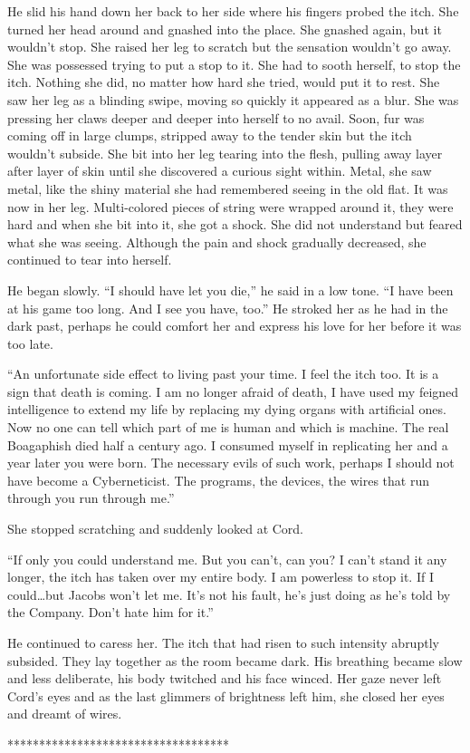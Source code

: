 He slid his hand down her back to her side where his fingers probed the
itch. She turned her head around and gnashed into the place. She gnashed
again, but it wouldn't stop. She raised her leg to scratch but the
sensation wouldn't go away. She was possessed trying to put a stop to
it. She had to sooth herself, to stop the itch. Nothing she did, no
matter how hard she tried, would put it to rest. She saw her leg as a
blinding swipe, moving so quickly it appeared as a blur. She was
pressing her claws deeper and deeper into herself to no avail. Soon, fur
was coming off in large clumps, stripped away to the tender skin but the
itch wouldn't subside. She bit into her leg tearing into the flesh,
pulling away layer after layer of skin until she discovered a curious
sight within. Metal, she saw metal, like the shiny material she had
remembered seeing in the old flat. It was now in her leg. Multi-colored
pieces of string were wrapped around it, they were hard and when she bit
into it, she got a shock. She did not understand but feared what she was
seeing. Although the pain and shock gradually decreased, she continued
to tear into herself.

He began slowly. ``I should have let you die,'' he said in a low tone.
``I have been at his game too long. And I see you have, too.'' He
stroked her as he had in the dark past, perhaps he could comfort her and
express his love for her before it was too late.

``An unfortunate side effect to living past your time. I feel the itch
too. It is a sign that death is coming. I am no longer afraid of death,
I have used my feigned intelligence to extend my life by replacing my
dying organs with artificial ones. Now no one can tell which part of me
is human and which is machine. The real Boagaphish died half a century
ago. I consumed myself in replicating her and a year later you were
born. The necessary evils of such work, perhaps I should not have become
a Cyberneticist. The programs, the devices, the wires that run through
you run through me.''

She stopped scratching and suddenly looked at Cord.

``If only you could understand me. But you can't, can you? I can't stand
it any longer, the itch has taken over my entire body. I am powerless to
stop it. If I could\ldots but Jacobs won't let me. It's not his fault,
he's just doing as he's told by the Company. Don't hate him for it.''

He continued to caress her. The itch that had risen to such intensity
abruptly subsided. They lay together as the room became dark. His
breathing became slow and less deliberate, his body twitched and his
face winced. Her gaze never left Cord's eyes and as the last glimmers of
brightness left him, she closed her eyes and dreamt of wires.

***********************************
